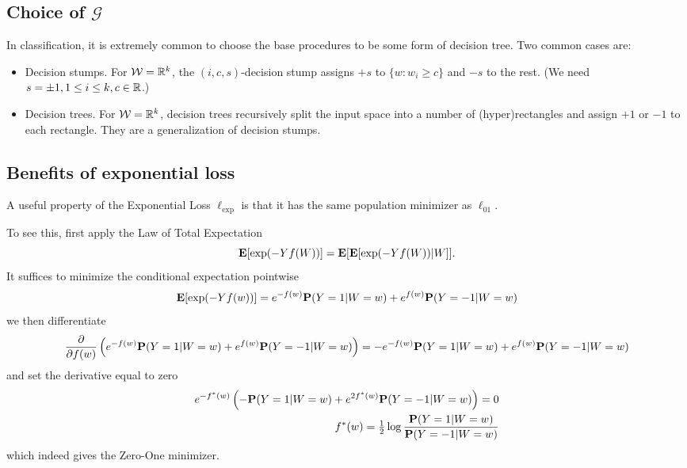 \subsection{Choice of \texorpdfstring{$\mathcal{G}$}{G}}
In classification, it is extremely common to choose the base procedures to be some form of decision tree. Two common cases are:
\begin{itemize}
	\item Decision stumps. For $\mathcal{W} = \mathbb{R}^k$, the $(i, c, s)$-decision stump assigns $+s$ to $\{w : w_i \ge c\}$ and $-s$ to the rest. (We need $s=\pm 1, 1 \le i \le k, c \in \mathbb{R}$.)
	\item Decision trees. For $\mathcal{W} = \mathbb{R}^k$, decision trees recursively split the input space into a number of (hyper)rectangles and assign $+1$ or $-1$ to each rectangle. They are a generalization of decision stumps.
\end{itemize}

\subsection{Benefits of exponential loss}
A useful property of the Exponential Loss $\ell_\text{exp}$ is that it has the same population minimizer as $\ell_{01}$.

To see this, first apply the Law of Total Expectation
\begin{equation*}
	\mathbf{E}[\exp(-Yf(W))] = \mathbf{E}[\mathbf{E}[\exp(-Yf(W))|W]].
\end{equation*}
It suffices to minimize the conditional expectation pointwise
\begin{equation*}
	\mathbf{E}[\exp(-Yf(w))] = e^{-f(w)}\mathbf{P}(Y=1|W=w) + e^{f(w)}\mathbf{P}(Y=-1|W=w)
\end{equation*}
we then differentiate
\begin{equation*}
	\frac{\partial}{\partial f(w)} \left( e^{-f(w)}\mathbf{P}(Y=1|W=w) + e^{f(w)}\mathbf{P}(Y=-1|W=w) \right) = -e^{-f(w)}\mathbf{P}(Y=1|W=w) + e^{f(w)}\mathbf{P}(Y=-1|W=w)
\end{equation*}
and set the derivative equal to zero
\begin{align*}
	e^{-f^*(w)} \left( -\mathbf{P}(Y=1|W=w) + e^{2f^*(w)}\mathbf{P}(Y=-1|W=w) \right) = 0 \\
	f^*(w) = \tfrac{1}{2}\log \frac{\mathbf{P}(Y=1|W=w)}{\mathbf{P}(Y=-1|W=w)}
\end{align*}
which indeed gives the Zero-One minimizer.

